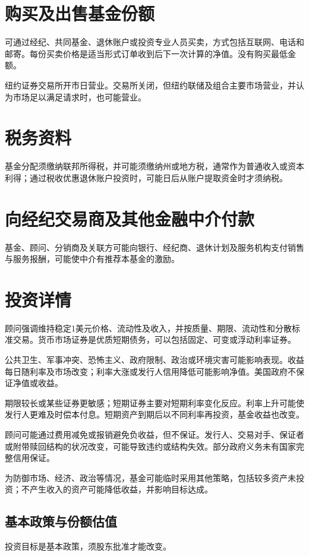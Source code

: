 \documentclass[UTF8,fontset=none,11pt,a4paper]{ctexart}
\begin{document}
\section*{购买及出售基金份额}
可通过经纪、共同基金、退休账户或投资专业人员买卖，方式包括互联网、电话和邮寄。每份买卖价格是适当形式订单收到后下一次计算的净值。没有购买\allowbreak\mbox{最低金额。}


纽约证券交易所开市日营业。交易所关闭，但纽约联储及组合主要市场营业，并认为市场足以满足请求时，也\allowbreak\mbox{可能营业。}


\section*{税务资料}
基金分配须缴纳联邦所得税，并可能须缴纳州或地方税，通常作为普通收入或资本利得；通过税收优惠退休账户投资时，可能日后从账户提取资金时\allowbreak\mbox{才须纳税。}


\section*{向经纪交易商及其他金融中介付款}
基金、顾问、分销商及关联方可能向银行、经纪商、退休计划及服务机构支付销售与服务报酬，可能使中介有推荐本基\allowbreak\mbox{金的激励。}


\section*{投资详情}
顾问强调维持稳定1美元价格、流动性及收入，并按质量、期限、流动性和分散标准交易。货币市场证券是优质短期债务，可以包括固定、可变或浮动\allowbreak\mbox{利率证券。}


公共卫生、军事冲突、恐怖主义、政府限制、政治或环境灾害可能影响表现。收益每日随利率及市场改变；利率大涨或发行人信用降低可能影响净值。美国政府不保证净\allowbreak\mbox{值或收益。}


期限较长或某些证券更敏感；短期证券主要对短期利率变化反应。利率上升可能使发行人更难及时偿本付息。短期资产到期后以不同利率再投资，基金收\allowbreak\mbox{益也改变。}


顾问可能通过费用减免或报销避免负收益，但不保证。发行人、交易对手、保证者或附带赎回结构的状况改变，可能导致违约或结构失效。部分政府义务未有国家完整\allowbreak\mbox{信用保证。}


为防御市场、经济、政治等情况，基金可能临时采用其他策略，包括较多资产未投资；不产生收入的资产可能降低收益，并影响\allowbreak\mbox{目标达成。}


\subsection*{基本政策与份额估值}
投资目标是基本政策，须股东批准\allowbreak\mbox{才能改变。}
\end{document}
